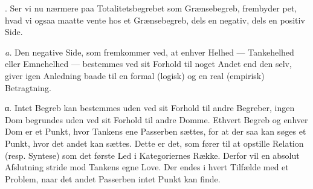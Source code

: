 \documentclass[12pt]{article}
\newcommand{\opage}[1]{\marginnote{\footnotesize\textit{[#1]}}}
\begin{document}
. Ser vi nu nærmere paa Totalitetsbegrebet som Grænsebegreb, frembyder
pet, hvad vi ogsaa maatte vente hos et Grænsebegreb, dels en negativ, dels en
positiv Side.

\textit{a.} Den negative Side, som fremkommer ved, at enhver Helhed ---
Tankehelhed eller Emnehelhed --- bestemmes ved sit Forhold til noget Andet end
den selv, giver igen Anledning baade til en formal (logisk) og en real
(empirisk) Betragtning.

α. Intet Begreb kan bestemmes uden ved sit Forhold til andre Begreber,
ingen Dom begrundes uden ved sit Forhold til andre Domme. Ethvert Begreb og
enhver Dom er et Punkt, hvor Tankens ene Passerben sættes, for at der saa kan
søges et Punkt, hvor det andet kan sættes. Dette er det, som fører til at
opstille Relation (resp. Syntese) som det første Led i Kategoriernes Række.
Derfor vil en
\setcounter{footnote}{0}%
\opage{76}absolut Afslutning stride mod Tankens egne Love. Der endes i hvert
Tilfælde med et Problem, naar det andet Passerben intet Punkt kan finde.
\end{document}
